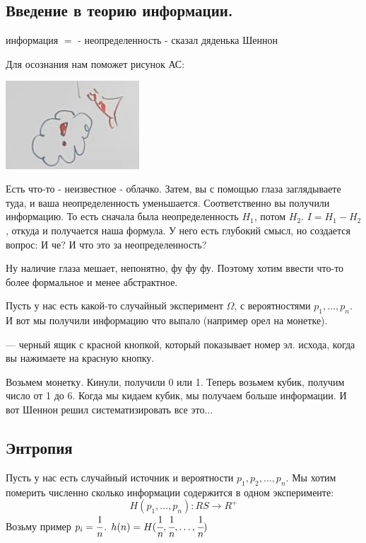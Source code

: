 \subsection{Введение в теорию информации.}

информация $=$ - неопределенность - сказал дяденька Шеннон

Для осознания нам поможет рисунок АС:
\begin{center}
    \includegraphics[width = 5cm]{assets/4_1_1.jpg}
\end{center}
Есть что-то - неизвестное - облачко. Затем, вы с помощью глаза заглядываете туда, и ваша неопределенность уменьшается. Соответственно вы получили информацию. То есть сначала была неопределенность $H_1$, потом $H_2$.  $I = H_1-H_2$, откуда и получается наша формула. У него есть глубокий смысл, но создается вопрос: \flqq И че? И что это за неопределенность?\frqq

Ну наличие глаза мешает, непонятно, фу фу фу. Поэтому хотим ввести что-то более формальное и менее абстрактное.

Пусть у нас есть какой-то случайный эксперимент $\Omega$, с вероятностями $p_1,\ldots, p_n$. И вот мы получили информацию что выпало (например орел на монетке).

 --- черный ящик с красной кнопкой, который показывает номер эл. исхода, когда вы нажимаете на красную кнопку.

Возьмем монетку. Кинули, получили 0 или 1. Теперь возьмем кубик, получим число от 1 до 6. Когда мы кидаем кубик, мы получаем больше информации. И вот Шеннон решил систематизировать все это...

\subsection{Энтропия}

Пусть у нас есть случайный источник и вероятности $p_1,p_2,\ldots ,p_n$. Мы хотим померить численно сколько информации содержится в одном эксперименте:
$$H(p_1,\ldots,p_n):RS\rightarrow R^+$$ 
Возьму пример $p_i = \cfrac{1}{n}$.
$h(n) = H(\cfrac{1}{n},\cfrac{1}{n},\ldots,\cfrac{1}{n})$

